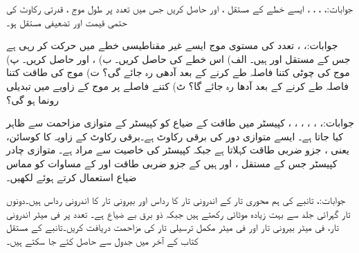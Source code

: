 جوابات:، ، ، ، 
ایسے خطے کے مستقل ،  اور  حاصل کریں جس میں   تعدد پر طول موج ، قدرتی رکاوٹ کی حتمی قیمت  اور  تضعیفی مستقل  ہو۔

جوابات:،  ،
 تعدد کی مستوی موج ایسے  غیر مقناطیسی خطے میں حرکت کر رہی ہے جس کے مستقل  اور  ہیں۔ الف) اس خطے کی  حاصل کریں۔ ب) ،  اور  حاصل کریں۔ پ) موج کی چوٹی کتنا فاصلہ طے کرنے کے بعد آدھی رہ جائے گی؟  ت) موج کی طاقت کتنا فاصلہ طے کرنے کے بعد آدھا رہ جائے گا؟   ٹ) کتنے فاصلے پر موج کے زاویے میں  تبدیلی رونما ہو گی؟

جوابات:، ، ، ، ، ، 
کپیسٹر  میں طاقت کے ضیاع کو کپیسٹر کے متوازی مزاحمت  سے ظاہر کیا جاتا ہے۔ ایسے متوازی دور کی برقی رکاوٹ  ہے۔برقی رکاوٹ کے زاویہ  کا کوسائن، یعنی ، جزو ضربی طاقت کہلاتا ہے جبکہ کپیسٹر کی خاصیت  سے مراد  ہے۔ متوازی چادر کپیسٹر  جس کے مستقل ،  اور  ہیں کے جزو ضربی طاقت اور  کے مساوات کو مماس ضیاع  استعمال کرتے ہوئے لکھیں۔

جوابات:، 
تانبے کی ہم محوری تار کے اندرونی تار کا رداس  اور  بیرونی تار کا اندرونی رداس  ہیں۔دونوں تار گہرائی جلد  سے بہت زیادہ موٹائی رکھتے ہیں جبکہ ذو برق بے ضیاع ہے۔ تعدد پر فی میٹر اندرونی تار، فی میٹر بیرونی تار اور فی میٹر مکمل ترسیلی تار کی مزاحمت دریافت کریں۔تانبے کے مستقل کتاب کے آخر میں جدول  سے حاصل کئے جا سکتے ہیں۔

